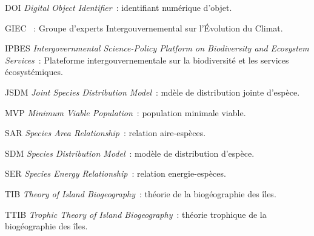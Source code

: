 \listeabrev
\begin{liste}

\item[DOI] \textit{Digital Object Identifier}~: identifiant numérique d'objet.

\item[GIEC]~: Groupe d'experts Intergouvernemental sur l'Évolution du Climat.

\item[IPBES] \textit{Intergovernmental Science-Policy Platform on Biodiversity and Ecosystem Services}~: Plateforme intergouvernementale sur la biodiversité et les services écosystémiques.

\item[JSDM] \textit{Joint Species Distribution Model}~: mdèle de distribution jointe d'espèce.

\item[MVP] \textit{Minimum Viable Population}~: population minimale viable.

\item[SAR] \textit{Species Area Relationship}~: relation aire-espèces.

\item[SDM] \textit{Species Distribution Model}~: modèle de distribution d'espèce.

\item[SER] \textit{Species Energy Relationship}~: relation energie-espèces.

\item[TIB] \textit{Theory of Island Biogeography}~: théorie de la biogéographie des îles.

\item[TTIB] \textit{Trophic Theory of Island Biogeography}~: théorie trophique de la biogéographie des îles.

\end{liste}




%
%


\cleardoublepage
